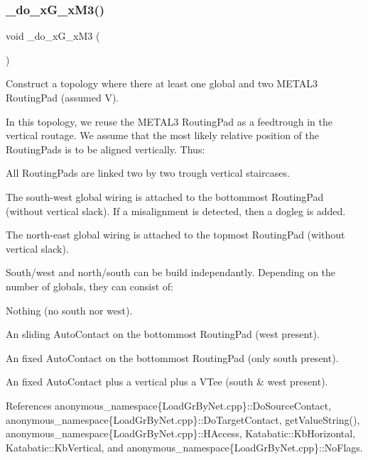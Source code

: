 \subsubsection{\texorpdfstring{\+\_\+do\+\_\+x\+G\+\_\+x\+M3()}{\_do\_xG\_xM3()}}
{\footnotesize\ttfamily void \+\_\+do\+\_\+x\+G\+\_\+x\+M3 (\begin{DoxyParamCaption}{ }\end{DoxyParamCaption})\hspace{0.3cm}{\ttfamily [private]}}

Construct a topology where there at least one global and two {\ttfamily M\+E\+T\+A\+L3} Routing\+Pad (assumed V).

In this topology, we reuse the {\ttfamily M\+E\+T\+A\+L3} Routing\+Pad as a feedtrough in the vertical routage. We assume that the most likely relative position of the Routing\+Pads is to be aligned vertically. Thus\+:
\begin{DoxyItemize}
\item All Routing\+Pads are linked two by two trough vertical staircases.
\item The south-\/west global wiring is attached to the bottommost Routing\+Pad (without vertical slack). If a misalignment is detected, then a dogleg is added.
\item The north-\/east global wiring is attached to the topmost Routing\+Pad (without vertical slack).
\end{DoxyItemize}

South/west and north/south can be build independantly. Depending on the number of globals, they can consist of\+:
\begin{DoxyItemize}
\item Nothing (no south nor west).
\item An sliding Auto\+Contact on the bottommost Routing\+Pad (west present).
\item An fixed Auto\+Contact on the bottommost Routing\+Pad (only south present).
\item An fixed Auto\+Contact plus a vertical plus a V\+Tee (south \& west present).
\end{DoxyItemize}

 

References anonymous\+\_\+namespace\{\+Load\+Gr\+By\+Net.\+cpp\}\+::\+Do\+Source\+Contact, anonymous\+\_\+namespace\{\+Load\+Gr\+By\+Net.\+cpp\}\+::\+Do\+Target\+Contact, get\+Value\+String(), anonymous\+\_\+namespace\{\+Load\+Gr\+By\+Net.\+cpp\}\+::\+H\+Access, Katabatic\+::\+Kb\+Horizontal, Katabatic\+::\+Kb\+Vertical, and anonymous\+\_\+namespace\{\+Load\+Gr\+By\+Net.\+cpp\}\+::\+No\+Flags.

